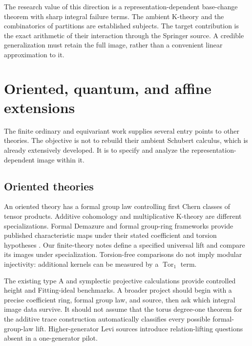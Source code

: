 The research value of this direction is a representation-dependent base-change theorem with sharp integral failure terms. The ambient K-theory and the combinatorics of partitions are established subjects. The target contribution is the exact arithmetic of their interaction through the Springer source. A credible generalization must retain the full image, rather than a convenient linear approximation to it.


\section{Oriented, quantum, and affine extensions}
The finite ordinary and equivariant work supplies several entry points to other theories. The objective is not to rebuild their ambient Schubert calculus, which is already extensively developed. It is to specify and analyze the representation-dependent image within it.

\subsection{Oriented theories}
An oriented theory has a formal group law controlling first Chern classes of tensor products. Additive cohomology and multiplicative K-theory are different specializations. Formal Demazure and formal group-ring frameworks provide published characteristic maps under their stated coefficient and torsion hypotheses \cite{CPZ,CZZ}. Our finite-theory notes define a specified universal lift and compare its images under specialization. Torsion-free comparisons do not imply modular injectivity: additional kernels can be measured by a $\operatorname{Tor}_1$ term.

The existing type A and symplectic projective calculations provide controlled height and Fitting-ideal benchmarks. A broader project should begin with a precise coefficient ring, formal group law, and source, then ask which integral image data survive. It should not assume that the torus degree-one theorem for the additive trace construction automatically classifies every possible formal-group-law lift. Higher-generator Levi sources introduce relation-lifting questions absent in a one-generator pilot.

